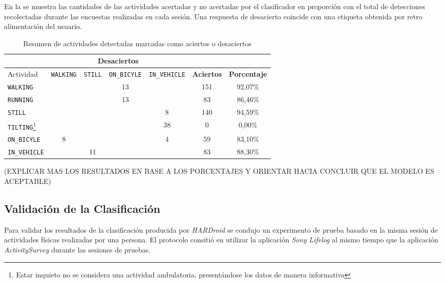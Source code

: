 En la  se muestra las cantidades de las actividades
acertadas y no acertadas por el clasificador  en proporción
con el total de detecciones recolectadas durante las encuestas realizadas
en cada sesión. Una respuesta de desacierto coincide con una etiqueta
obtenida por retro alimentación del usuario.

\begin{table}[h]
\begin{centering}
\begin{tabular}{|l|c|c|c|c|c|c|}
\cline{2-5} 
\multicolumn{1}{l|}{} & \multicolumn{4}{c|}{\textbf{Desaciertos}} & \multicolumn{1}{c}{} & \multicolumn{1}{c}{}\tabularnewline
\hline 
Actividad & \texttt{\footnotesize{}WALKING} & \texttt{\footnotesize{}STILL} & \texttt{\footnotesize{}ON\_BICYLE} & \texttt{\footnotesize{}IN\_VEHICLE} & \textbf{\small{}Aciertos} & \textbf{\small{}Porcentaje}\tabularnewline
\hline 
\hline 
\texttt{\footnotesize{}WALKING} &  &  & 13 &  & 151 & 92,07\%\tabularnewline
\hline 
\texttt{\footnotesize{}RUNNING} &  &  & 13 &  & 83 & 86,46\%\tabularnewline
\hline 
\texttt{\footnotesize{}STILL} &  &  &  & 8 & 140 & 94,59\%\tabularnewline
\hline 
\texttt{\footnotesize{}TILTING}\emph{\footnotesize{}}\footnote{{\footnotesize{}Estar inquieto no se considera una actividad ambulatoria,
presentándose los datos de manera informativa}} &  &  &  & 38 & 0 & 0,00\%\tabularnewline
\hline 
\texttt{\footnotesize{}ON\_BICYLE} & 8 &  &  & 4 & 59 & 83,10\%\tabularnewline
\hline 
\texttt{\footnotesize{}IN\_VEHICLE} &  & 11 &  &  & 83 & 88,30\%\tabularnewline
\hline 
\end{tabular}
\par\end{centering}
\caption[Aciertos y desaciertos de actividades humanas detectadas]{\label{tab6:vencuesta}Resumen de actividades detectadas marcadas
como aciertos o desaciertos}
\end{table}

(EXPLICAR MAS LOS RESULTADOS EN BASE A LOS PORCENTAJES Y ORIENTAR
HACIA CONCLUIR QUE EL MODELO ES ACEPTABLE)

\subsection{Validación de la Clasificación}

Para validar los resultados de la clasificación producida por \emph{HARDroid
}se condujo un experimento de prueba basado en la misma sesión de
actividades físicas realizadas por una persona. El protocolo consitió
en utilizar la aplicación \emph{Sony} \emph{Lifelog} al mismo tiempo
que la aplicación \emph{ActivitySurvey} durante las sesiones de pruebas. 

